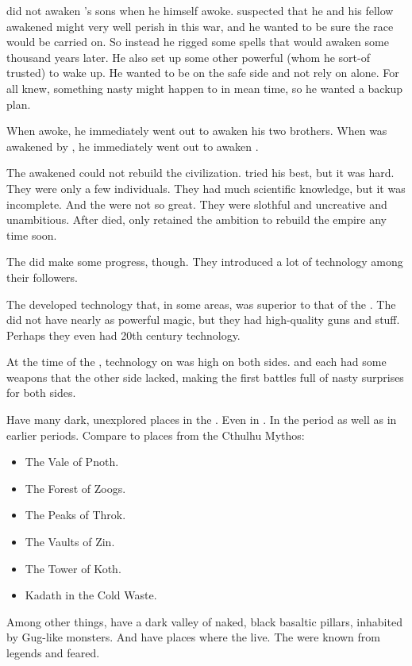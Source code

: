 \Sethicus did not awaken \Tiamat's sons when he himself awoke. 
\Sethicus suspected that he and his fellow awakened \dragons might very well perish in this war, and he wanted to be sure the \draconian race would be carried on. 
So instead he rigged some spells that would awaken \Nexagglachel some thousand years later.
He also set up some other powerful \dragons (whom he sort-of trusted) to wake up. 
He wanted to be on the safe side and not rely on \Nexagglachel alone.
For all \Sethicus knew, something nasty might happen to \Nexagglachel in mean time, so he wanted a backup plan. 

When \Nexagglachel awoke, he immediately went out to awaken his two brothers.
When \Ishnaruchaefir was awakened by \Nexagglachel, he immediately went out to awaken \Rystessakhin. 

The awakened \dragons could not rebuild the \ophidian civilization. 
\Nexagglachel tried his best, but it was hard. 
They were only a few individuals.
They had much scientific knowledge, but it was incomplete.
And the \quiljaaran were not so great. 
They were slothful and uncreative and unambitious.
After \Nexagglachel died, only \Secherdamon retained the ambition to rebuild the \ophidian empire any time soon. 

The \dragons did make some progress, though. 
They introduced a lot of technology among their followers.

The \aryothim developed technology that, in some areas, was superior to that of the \quiljaaran. 
The \aryothim did not have nearly as powerful magic, but they had high-quality guns and stuff.
Perhaps they even had 20th century technology. 

At the time of the \secondbanewar, technology on \Miith was high on both sides. 
\Miithians and \resphain each had some weapons that the other side lacked, making the first battles full of nasty surprises for both sides. 



Have many dark, unexplored  places in the \wylde. 
Even in \Velcad. 
In the \thirdbanewar period as well as in earlier periods. 
Compare to places from the Cthulhu Mythos:
\begin{itemize}
  \item The Vale of Pnoth.
  \item The Forest of Zoogs.
  \item The Peaks of Throk.
  \item The Vaults of Zin.
  \item The Tower of Koth. 
  \item Kadath in the Cold Waste.
\end{itemize}
Among other things, have a dark valley of naked, black basaltic pillars, inhabited by Gug-like monsters. 
And have places where the \quiljaaran live. 
The \serpentmen were known from legends and feared. 



